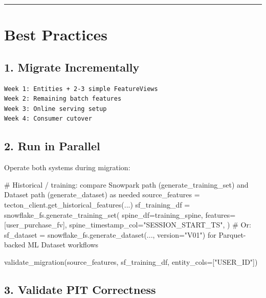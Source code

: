 \documentclass[
  letterpaper,
  DIV=11,
  numbers=noendperiod]{scrreprt}
\newenvironment{Shaded}{\begin{snugshade}}{\end{snugshade}}
\newcommand{\CommentTok}[1]{\textcolor[rgb]{0.37,0.37,0.37}{#1}}
\newcommand{\NormalTok}[1]{\textcolor[rgb]{0.00,0.23,0.31}{#1}}
\newcommand{\OperatorTok}[1]{\textcolor[rgb]{0.37,0.37,0.37}{#1}}
\newcommand{\StringTok}[1]{\textcolor[rgb]{0.13,0.47,0.30}{#1}}
\begin{document}
\begin{center}\rule{0.5\linewidth}{0.5pt}\end{center}

\hypertarget{best-practices-11}{%
\section{Best Practices}\label{best-practices-11}}

\hypertarget{migrate-incrementally}{%
\subsection{1. Migrate Incrementally}\label{migrate-incrementally}}

\begin{verbatim}
Week 1: Entities + 2-3 simple FeatureViews
Week 2: Remaining batch features
Week 3: Online serving setup
Week 4: Consumer cutover
\end{verbatim}

\hypertarget{run-in-parallel}{%
\subsection{2. Run in Parallel}\label{run-in-parallel}}

Operate both systems during migration:

\begin{Shaded}
\begin{Highlighting}[]
\CommentTok{\# Historical / training: compare Snowpark path (generate\_training\_set) and Dataset path (generate\_dataset) as needed}
\NormalTok{source\_features }\OperatorTok{=}\NormalTok{ tecton\_client.get\_historical\_features(...)}
\NormalTok{sf\_training\_df }\OperatorTok{=}\NormalTok{ snowflake\_fs.generate\_training\_set(}
\NormalTok{    spine\_df}\OperatorTok{=}\NormalTok{training\_spine,}
\NormalTok{    features}\OperatorTok{=}\NormalTok{[user\_purchase\_fv],}
\NormalTok{    spine\_timestamp\_col}\OperatorTok{=}\StringTok{"SESSION\_START\_TS"}\NormalTok{,}
\NormalTok{)}
\CommentTok{\# Or: sf\_dataset = snowflake\_fs.generate\_dataset(..., version="V01") for Parquet{-}backed ML Dataset workflows}

\NormalTok{validate\_migration(source\_features, sf\_training\_df, entity\_cols}\OperatorTok{=}\NormalTok{[}\StringTok{"USER\_ID"}\NormalTok{])}
\end{Highlighting}
\end{Shaded}

\hypertarget{validate-pit-correctness}{%
\subsection{3. Validate PIT
Correctness}\label{validate-pit-correctness}}
\end{document}
